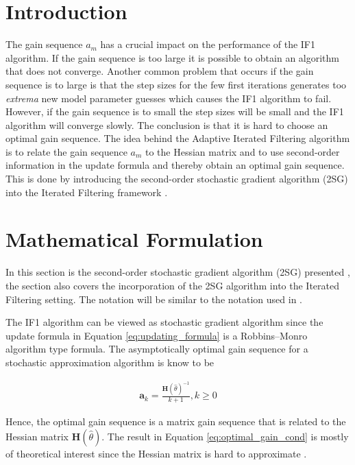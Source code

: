 \documentclass[twoside,openright]{report}
\begin{document}
\section{Introduction}

The gain sequence $a_m$ has a crucial impact on the performance of the IF1 algorithm. If the gain sequence is too large it is possible to obtain an algorithm that does not converge. Another common problem that occurs if the gain sequence is to large is that the step sizes for the few first iterations generates too \textit{extrema} new model parameter guesses which causes the IF1 algorithm to fail.  However, if the gain sequence is to small the step sizes will be small and the IF1 algorithm will converge slowly. The conclusion is that it is hard to choose an optimal gain sequence. The idea behind the Adaptive Iterated Filtering algorithm is to relate the gain sequence $a_m$ to the Hessian matrix and to use second-order information in the update formula and thereby obtain an optimal gain sequence. This is done by introducing the second-order stochastic gradient algorithm (2SG)  into the Iterated Filtering framework \cite{spall2000adaptive}. 


\section{Mathematical Formulation} \label{sec:mat_fom_AIF}

In this section is the second-order stochastic gradient algorithm (2SG) presented \cite{spall2000adaptive}, the section also covers the incorporation of the 2SG algorithm into the Iterated Filtering setting. The notation will be similar to the notation used in \cite{spall2000adaptive}. 

The IF1 algorithm can be viewed as stochastic gradient algorithm since the update formula in Equation \ref{eq:updating_formula} is a  Robbins–Monro algorithm type formula. The asymptotically optimal gain sequence for a stochastic approximation algorithm is know to be \cite{spall2005introduction}

\begin{align}
    \mathbf{a}_k = \frac{\mathbf{H}(\hat{\theta})^{-1}}{k+1} , k \geq 0 \label{eq:optimal_gain_cond}
\end{align}

Hence, the optimal gain sequence is a matrix gain sequence that is related to the Hessian matrix $\mathbf{H}(\hat{\theta})$. The result in Equation \ref{eq:optimal_gain_cond} is mostly of theoretical interest since the Hessian matrix is hard to approximate \cite{spall2005introduction}.   
\end{document}

